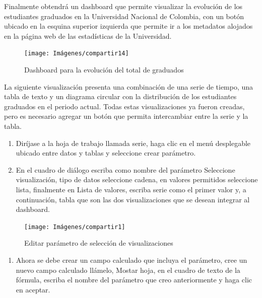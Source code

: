 \documentclass[
]{book}
\providecommand{\tightlist}{%
  \setlength{\itemsep}{0pt}\setlength{\parskip}{0pt}}
\begin{document}
Finalmente obtendrá un dashboard que permite visualizar la evolución de los estudiantes graduados en la Universidad Nacional de Colombia, con un botón ubicado en la esquina superior izquierda que permite ir a los metadatos alojados en la página web de las estadísticas de la Universidad.

\begin{figure}

{\centering \texttt{[image: Imágenes/compartir14]} 

}

\caption{Dashboard para la evolución del total de graduados}\label{fig:tableroevolucion-fig}
\end{figure}

La siguiente visualización presenta una combinación de una serie de tiempo, una tabla de texto y un diagrama circular con la distribución de los estudiantes graduados en el periodo actual. Todas estas visualizaciones ya fueron creadas, pero es necesario agregar un botón que permita intercambiar entre la serie y la tabla.

\begin{enumerate}
\def\labelenumi{\arabic{enumi}.}
\item
  Diríjase a la hoja de trabajo llamada serie, haga clic en el menú desplegable ubicado entre datos y tablas y seleccione crear parámetro.
\item
  En el cuadro de diálogo escriba como nombre del parámetro Seleccione visualización, tipo de datos seleccione cadena, en valores permitidos seleccione lista, finalmente en Lista de valores, escriba serie como el primer valor y, a continuación, tabla que son las dos visualizaciones que se desean integrar al dashboard.
\end{enumerate}

\begin{figure}

{\centering \texttt{[image: Imágenes/compartir1]} 

}

\caption{Editar parámetro de selección de visualizaciones}\label{fig:paso2tablero-fig}
\end{figure}

\begin{enumerate}
\def\labelenumi{\arabic{enumi}.}
\setcounter{enumi}{2}
\tightlist
\item
  Ahora se debe crear un campo calculado que incluya el parámetro, cree un nuevo campo calculado llámelo, Mostar hoja, en el cuadro de texto de la fórmula, escriba el nombre del parámetro que creo anteriormente y haga clic en aceptar.
\end{enumerate}
\end{document}
